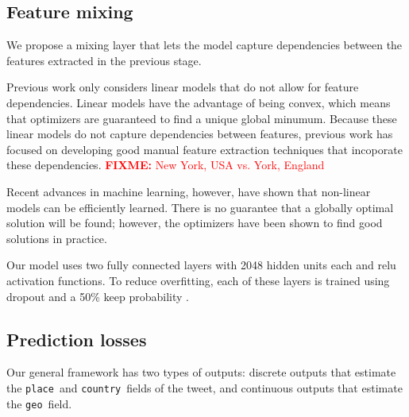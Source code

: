 \documentclass[sigconf,10pt]{acmart}
\newcommand{\fixme}[1]{\textcolor{red}{\textbf{FIXME:} {#1}}}
\newcommand{\tweetdata}[1]{{\texttt{#1}~}}
\newcommand{\place        }{\tweetdata{place}}
\renewcommand{\country      }{\tweetdata{country}}
\newcommand{\geo          }{\tweetdata{geo}}
\begin{document}
\subsection{Feature mixing}

We propose a mixing layer that lets the model capture dependencies between the features extracted in the previous stage.

Previous work only considers linear models that do not allow for feature dependencies.
Linear models have the advantage of being convex,
which means that optimizers are guaranteed to find a unique global minumum.
Because these linear models do not capture dependencies between features,
previous work has focused on developing good manual feature extraction techniques that incoporate these dependencies.
\fixme{New York, USA vs. York, England}

Recent advances in machine learning, however, have shown that non-linear models can be efficiently learned.
There is no guarantee that a globally optimal solution will be found;
however, the optimizers have been shown to find good solutions in practice.

Our model uses two fully connected layers with 2048 hidden units each and relu activation functions.
To reduce overfitting, each of these layers is trained using dropout and a 50\% keep probability \citep{}.

\subsection{Prediction losses}

Our general framework has two types of outputs:
discrete outputs that estimate the \place and \country fields of the tweet,
and continuous outputs that estimate the \geo field.
\end{document}
